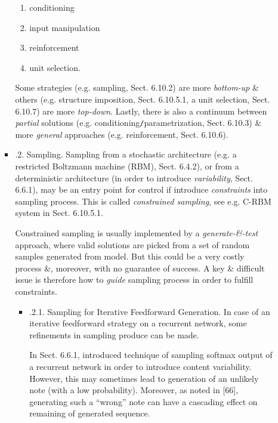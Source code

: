 \documentclass{article}
\begin{document}
\begin{itemize}
\begin{itemize}
\begin{itemize}
\begin{enumerate}
				\item conditioning
				\item input manipulation
				\item reinforcement
				\item unit selection.
			\end{enumerate}
			Some strategies (e.g. sampling, Sect. 6.10.2) are more {\it bottom-up} \& others (e.g. structure imposition, Sect. 6.10.5.1, a unit selection, Sect. 6.10.7) are more {\it top-down}. Lastly, there is also a continuum between {\it partial} solutions (e.g. conditioning{\tt/}parametrization, Sect. 6.10.3) \& more {\it general} approaches (e.g. reinforcement, Sect. 6.10.6).
			\item {.2. Sampling.} Sampling from a stochastic architecture (e.g. a restricted Boltzmann machine (RBM), Sect. 6.4.2), or from a deterministic architecture (in order to introduce {\it variability}, Sect. 6.6.1), may be an entry point for control if introduce {\it constraints} into sampling process. This is called {\it constrained sampling}, see e.g. C-RBM system in Sect. 6.10.5.1.

			Constrained sampling is usually implemented by a {\it generate-\&-test} approach, where valid solutions are picked from a set of random samples generated from model. But this could be a very costly process \&, moreover, with no guarantee of success. A key \& difficult issue is therefore how to {\it guide} sampling process in order to fulfill constraints.
			\begin{itemize}
				\item {.2.1. Sampling for Iterative Feedforward Generation.} In case of an iterative feedforward strategy on a recurrent network, some refinements in sampling produce can be made.

				In Sect. 6.6.1, introduced technique of sampling softmax output of a recurrent network in order to introduce content variability. However, this may sometimes lead to generation of an unlikely note (with a low probability). Moreover, as noted in [66], generating such a ``wrong'' note can have a cascading effect on remaining of generated sequence.


\end{itemize}
\end{itemize}
\end{itemize}
\end{itemize}
\end{document}
